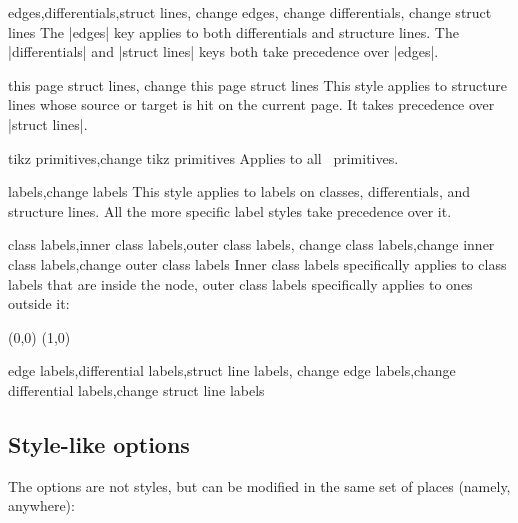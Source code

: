 \begin{sseqdata}[name = basic, cohomological Serre grading]
\begin{stylekeylist}{
    edges,differentials,struct lines,
    change edges, change differentials, change struct lines
}%
The |edges| key applies to both differentials and structure lines. The
|differentials| and |struct lines| keys both take precedence over |edges|.
\end{stylekeylist}

\begin{stylekeylist}{this page struct lines, change this page struct lines}%
This style applies to structure lines whose source or target is hit on the
current page. It takes precedence over |struct lines|.
\end{stylekeylist}

\begin{stylekeylist}{tikz primitives,change tikz primitives}
Applies to all \tikzpkg\  primitives.
\end{stylekeylist}


\begin{stylekeylist}{labels,change labels}%
This style applies to labels on classes, differentials, and structure lines. All
the more specific label styles take precedence over it.
\end{stylekeylist}

\begin{stylekeylist}{
    class labels,inner class labels,outer class labels,
    change class labels,change inner class labels,change outer class labels
}%
Inner class labels specifically applies to class labels that are inside the
node, outer class labels specifically applies to ones outside it:
\begin{codeexample}[]
\begin{sseqpage}[ no axes, classes = { inner sep = 1pt },
    label distance = 2pt,
    outer class labels = { red },
    inner class labels = { blue } ]
\class["a", "b" above](0,0)
\class["a", "c" right](1,0)
\end{sseqpage}
\end{codeexample}
\end{stylekeylist}

\begin{stylekeylist}{
    edge labels,differential labels,struct line labels,
    change edge labels,change differential labels,change struct line labels
}%

\end{stylekeylist}


\subsection{Style-like options}
The options are not styles, but can be modified in the same set of places
(namely, anywhere):


\end{sseqdata}
